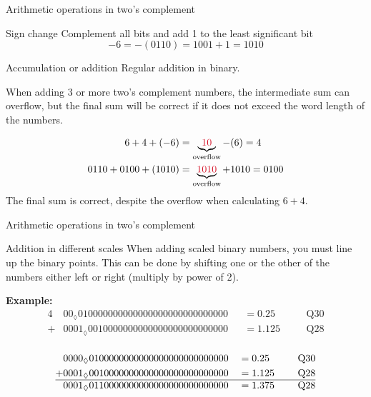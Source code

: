 \documentclass[10pt]{beamer}
\begin{document}
%
\begin{frame}{Arithmetic operations in two's complement}
	\begin{block}{Sign change}
		Complement all bits and add 1 to the least significant bit
		\begin{equation*}
		-6 = -(0110) = 1001 + 1 = 1010
		\end{equation*}
	\end{block}

	\begin{block}{Accumulation or addition}
		Regular addition in binary.
		
		When adding 3 or more two's complement numbers, the intermediate sum can overflow, but the final sum will be correct if it does not exceed the word length of the numbers.
		
		\begin{align*}
			6 + 4 + (-6) &= \underbrace{{\color{red2} 10}}_{\text{overflow}} - (6) = 4 \\
			0110 + 0100 + (1010) &= \underbrace{{\color{red2} 1010}}_{\text{overflow}} + 1010 = 0100
		\end{align*}
		The final sum is correct, despite the overflow when calculating $6+4$. 
	\end{block}
\end{frame}

%
\begin{frame}{Arithmetic operations in two's complement}
\begin{block}{Addition in different scales}
	When adding scaled binary numbers, you must line up the binary points. This can be done by shifting one or the other of the numbers either left or right (multiply by power of 2).
	
	\textbf{Example:}
	\begin{alignat*}{4}
	&00_\lozenge 	  010000000000000000000000000000 &&= 0.25 &&&~\text{Q30} \\
	+ & 0001_\lozenge 0010000000000000000000000000 &&= 1.125 &&&~\text{Q28} \\
	\end{alignat*}
	
	\begin{alignat*}{4}
	&0000_\lozenge 0100000000000000000000000000 &&= 0.25 &&&~\text{Q30} \\
	+ & 0001_\lozenge 0010000000000000000000000000 &&= 1.125 &&&~\text{Q28} \\
	\hline
	&0001_\lozenge 0110000000000000000000000000 &&= 1.375 &&&~\text{Q28} \\
	\end{alignat*}	
\end{block}
\end{frame}
\end{document}

